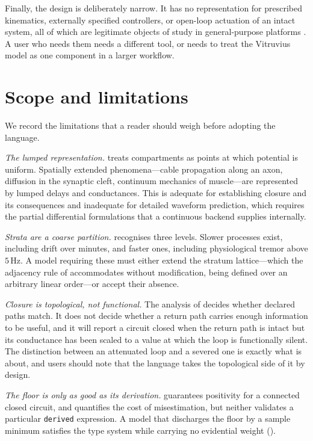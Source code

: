 \documentclass[11pt,twocolumn,a4paper]{article}
\theoremstyle{thmstyle}
\theoremstyle{definition}
\theoremstyle{remark}
\begin{document}
Finally, the design is deliberately narrow. It has no representation for
prescribed kinematics, externally specified controllers, or open-loop
actuation of an intact system, all of which are legitimate objects of study in
general-purpose platforms \citep{delp2007,seth2018,todorov2012}. A user who
needs them needs a different tool, or needs to treat the Vitruvius model as
one component in a larger workflow.

\section{Scope and limitations}
\label{sec:scope}

We record the limitations that a reader should weigh before adopting the
language.

\emph{The lumped representation.}  treats compartments
as points at which potential is uniform. Spatially extended phenomena---cable
propagation along an axon, diffusion in the synaptic cleft, continuum
mechanics of muscle---are represented by lumped delays and conductances. This
is adequate for establishing closure and its consequences and inadequate for
detailed waveform prediction, which requires the partial differential
formulations that a continuous backend supplies internally.

\emph{Strata are a coarse partition.}  recognises three
levels. Slower processes exist, including drift over minutes, and faster ones,
including physiological tremor above $5$\,Hz. A model requiring these must
either extend the stratum lattice---which the adjacency rule of
 accommodates without modification, being defined over
an arbitrary linear order---or accept their absence.

\emph{Closure is topological, not functional.} The analysis of
 decides whether declared paths match. It does not decide
whether a return path carries enough information to be useful, and it will
report a circuit closed when the return path is intact but its conductance has
been scaled to a value at which the loop is functionally silent. The
distinction between an attenuated loop and a severed one is exactly what
 is about, and users should note that the language
takes the topological side of it by design.

\emph{The floor is only as good as its derivation.} 
guarantees positivity for a connected closed circuit, and
 quantifies the cost of misestimation, but
neither validates a particular \texttt{derived} expression. A model that
discharges the floor by a sample minimum satisfies the type system while
carrying no evidential weight ().
\end{document}
